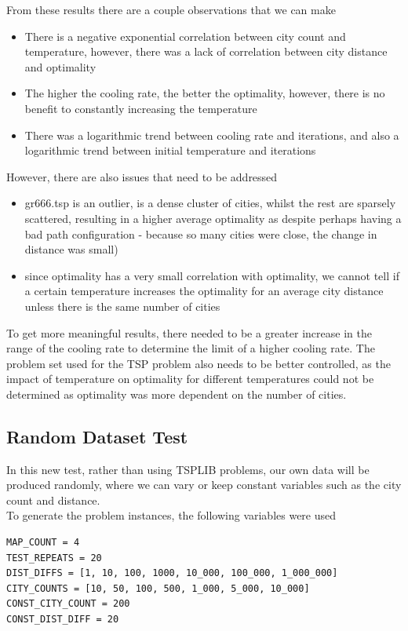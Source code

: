 \documentclass{article}
\begin{document}
From these results there are a couple observations that we can make
\begin{itemize}
    \item There is a negative exponential correlation between city count and temperature, however, there was a lack of correlation between city distance and optimality
    \item The higher the cooling rate, the better the optimality, however, there is no benefit to constantly increasing the temperature
    \item There was a logarithmic trend between cooling rate and iterations, and also a logarithmic trend between initial temperature and iterations
\end{itemize}

However, there are also issues that need to be addressed
\begin{itemize}
    \item gr666.tsp is an outlier, is a dense cluster of cities, whilst the rest are sparsely scattered, resulting in a higher average optimality as despite perhaps having a bad path configuration - because so many cities were close, the change in distance was small)
    \item since optimality has a very small correlation with optimality, we cannot tell if a certain temperature increases the optimality for an average city distance unless there is the same number of cities
\end{itemize}

To get more meaningful results, there needed to be a greater increase in the range of the cooling rate to determine the limit of a higher cooling rate.
The problem set used for the TSP problem also needs to be better controlled, as the impact of temperature on optimality for different temperatures could not be determined as optimality was more dependent on the number of cities.

\subsection{Random Dataset Test}
In this new test, rather than using TSPLIB problems, our own data will be produced randomly, where we can vary or keep constant variables such as the city count and distance.
\\

To generate the problem instances, the following variables were used

\begin{verbatim}
MAP_COUNT = 4
TEST_REPEATS = 20
DIST_DIFFS = [1, 10, 100, 1000, 10_000, 100_000, 1_000_000]
CITY_COUNTS = [10, 50, 100, 500, 1_000, 5_000, 10_000]
CONST_CITY_COUNT = 200
CONST_DIST_DIFF = 20
\end{verbatim}
\end{document}
